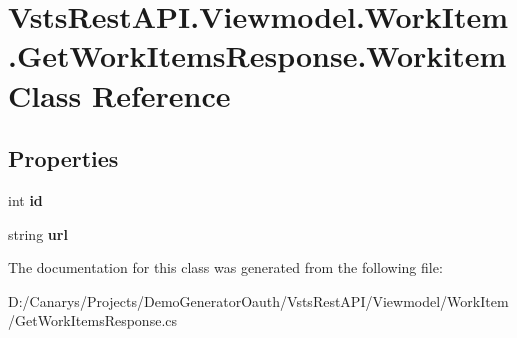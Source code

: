 \hypertarget{class_vsts_rest_a_p_i_1_1_viewmodel_1_1_work_item_1_1_get_work_items_response_1_1_workitem}{}\section{Vsts\+Rest\+A\+P\+I.\+Viewmodel.\+Work\+Item.\+Get\+Work\+Items\+Response.\+Workitem Class Reference}
\label{class_vsts_rest_a_p_i_1_1_viewmodel_1_1_work_item_1_1_get_work_items_response_1_1_workitem}
\subsection*{Properties}
\begin{DoxyCompactItemize}
\item 
\mbox{\label{class_vsts_rest_a_p_i_1_1_viewmodel_1_1_work_item_1_1_get_work_items_response_1_1_workitem_a26a63738fe325d954fbe89329e7cfc33}} 
int {\bfseries id}
\item 
\mbox{\label{class_vsts_rest_a_p_i_1_1_viewmodel_1_1_work_item_1_1_get_work_items_response_1_1_workitem_a2f3619f75bf6bb55c4e15c9b6d6d54b5}} 
string {\bfseries url}
\end{DoxyCompactItemize}


The documentation for this class was generated from the following file\+:\begin{DoxyCompactItemize}
\item 
D\+:/\+Canarys/\+Projects/\+Demo\+Generator\+Oauth/\+Vsts\+Rest\+A\+P\+I/\+Viewmodel/\+Work\+Item/Get\+Work\+Items\+Response.\+cs\end{DoxyCompactItemize}
